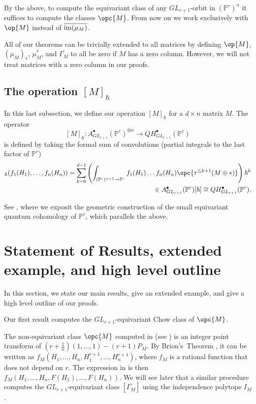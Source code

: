 \documentclass[12pt]{amsart}
\newcommand{\mb}{\mathbb}
\newcommand{\im}{{\rm im}}
\newcommand{\ol}{\overline}
\theoremstyle{plain}
\theoremstyle{definition}
\theoremstyle{remark}
\begin{document}
By the above, to compute the equivariant class of any $GL_{r+1}$-orbit in $(\mb{P}^r)^n$ it suffices to compute the classes $\opc{M}$. From now on we work exclusively with $\op{M}$ instead of $\ol{\im(\mu_M)}$.

All of our theorems can be trivially extended to all matrices by defining $\op{M}$, $(\mu_M)_*$, $\mu_M^*$, and $\ol{\Gamma_M}$ to all be zero if $M$ has a zero column. However, we will not treat matrices with a zero column in our proofs.










\subsection{The operation $[M]_\hbar$}\label{Mhbardef}
In this last subsection, we define our operation $[M]_\hbar$ for a $d \times n$ matrix $M$. The operator $$[M]_\hbar:A^\bullet_{GL_{r+1}}(\mb{P}^r)^{\otimes n} \to QH^\bullet_{GL_{r+1}}(\mb{P}^r)$$ is defined by taking the formal sum of convolutions (partial integrals to the last factor of $\mb{P}^r$)
\begin{align*}[M]_\hbar(f_1(H_1),\ldots,f_n(H_n))=\sum_{k=0}^{d-1}\left(\int_{(\mb{P}^r)^{n+1}\to \mb{P}^r}f_1(H_1)\ldots f_n(H_n)\opc{\tau^{\le k+1}(M\oplus \ast)}\right)\hbar^k\\\in A^\bullet_{GL_{r+1}}(\mb{P}^r)[\hbar]\cong QH^\bullet_{GL_{r+1}}(\mb{P}^r).\end{align*}

See , where we exposit the geometric construction of the small equivariant quantum cohomology of $\mb{P}^r$, which parallels the above.

\section{Statement of Results, extended example, and high level outline}
\label{statement}
In this section, we state our main results, give an extended example, and give a high level outline of our proofs.


Our first result computes the $GL_{r+1}$-equivariant Chow class of $\opc{M}$.

The non-equivariant class $\opc{M}$ computed in \cite{Binglin} (see ) is an integer point transform of $(r+\frac{1}{n})(1,\ldots,1) - (r+1)P_M$. By Brion's~Theorem \cite{BHS}, it can be written as $f_M(H_1,\ldots,H_n,H_1^{r+1},\ldots,H_n^{r+1})$, where $f_M$ is a rational function that does not depend on $r$. The expression in  is then $f_M(H_1,\ldots,H_n,F(H_1),\ldots,F(H_n))$. We will see later that a similar procedure computes the $GL_{r+1}$-equivariant class $[\ol{\Gamma_M}]$ using the independence polytope $I_M$.
\end{document}
